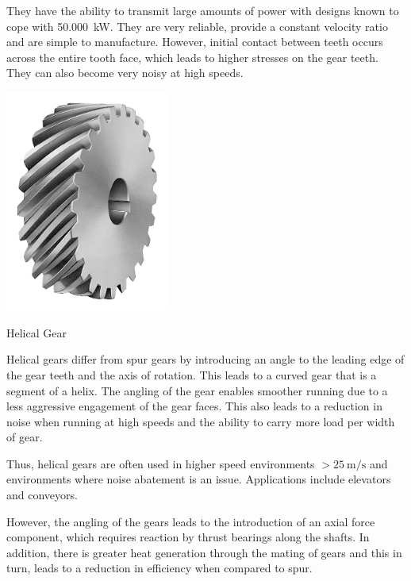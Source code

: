 They have the ability to transmit large amounts of power with designs known to cope with \SI{50,000}{\kilo\watt}. They are very reliable, provide a constant velocity ratio and are simple to manufacture. However, initial contact between teeth occurs across the entire tooth face, which leads to higher stresses on the gear teeth. They can also become very noisy at high speeds.

\begin{marginfigure}[12em]
  \centering
  \includegraphics[width=0.4\textwidth]{figs/helical.png}
  \caption{Helical Gear}
\end{marginfigure} 
Helical gears differ from spur gears by introducing an angle to the leading edge of the gear teeth and the axis of rotation. This leads to a curved gear that is a segment of a helix. The angling of the gear enables smoother running due to a less aggressive engagement of the gear faces. This also leads to a reduction in noise when running at high speeds and the ability to carry more load per width of gear.

Thus, helical gears are often used in higher speed environments $>\SI{25}{\metre\per\second}$ and environments where noise abatement is an issue. Applications include elevators and conveyors. 

However, the angling of the gears leads to the introduction of an axial force component, which requires reaction by thrust bearings along the shafts. In addition, there is greater heat generation through the mating of gears and this in turn, leads to a reduction in efficiency when compared to spur.

